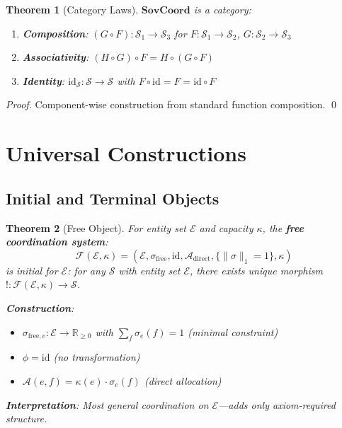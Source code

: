 \documentclass[11pt,a4paper]{article}
\newtheorem{theorem}{Theorem}[section]
\theoremstyle{definition}
\theoremstyle{remark}
\newcommand{\E}{\mathcal{E}}
\newcommand{\A}{\mathcal{A}}
\newcommand{\SovCoord}{\mathbf{SovCoord}}
\begin{document}
\begin{theorem}[Category Laws]
$\SovCoord$ is a category:
\begin{enumerate}
\item \textbf{Composition}: $(G \circ F): \mathcal{S}_1 \to \mathcal{S}_3$ for $F: \mathcal{S}_1 \to \mathcal{S}_2$, $G: \mathcal{S}_2 \to \mathcal{S}_3$
\item \textbf{Associativity}: $(H \circ G) \circ F = H \circ (G \circ F)$
\item \textbf{Identity}: $\text{id}_{\mathcal{S}}: \mathcal{S} \to \mathcal{S}$ with $F \circ \text{id} = F = \text{id} \circ F$
\end{enumerate}
\end{theorem}

\begin{proof}
Component-wise construction from standard function composition. \qed
\end{proof}

\section{Universal Constructions}

\subsection{Initial and Terminal Objects}

\begin{theorem}[Free Object]
\label{thm:free}
For entity set $\E$ and capacity $\kappa$, the \textbf{free coordination system}:
\[ \mathcal{F}(\E, \kappa) = (\E, \sigma_{\text{free}}, \text{id}, \A_{\text{direct}}, \{\|\sigma\|_1 = 1\}, \kappa) \]
is initial for $\E$: for any $\mathcal{S}$ with entity set $\E$, there exists unique morphism $! : \mathcal{F}(\E, \kappa) \to \mathcal{S}$.

\textbf{Construction}:
\begin{itemize}
\item $\sigma_{\text{free},e}: \E \to \mathbb{R}_{\ge 0}$ with $\sum_f \sigma_e(f) = 1$ (minimal constraint)
\item $\phi = \text{id}$ (no transformation)
\item $\A(e,f) = \kappa(e) \cdot \sigma_e(f)$ (direct allocation)
\end{itemize}

\textbf{Interpretation}: Most general coordination on $\E$—adds only axiom-required structure.
\end{theorem}
\end{document}
